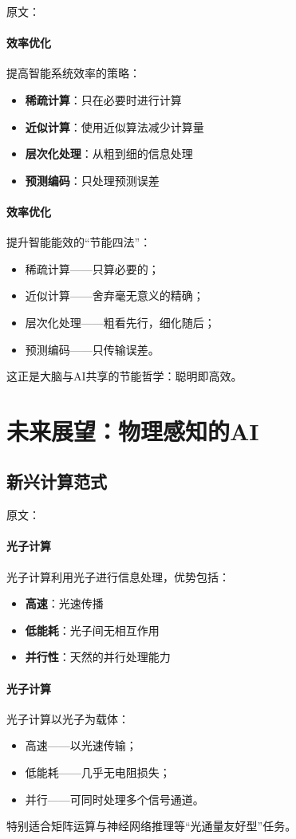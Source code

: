 原文：
\paragraph{效率优化}
提高智能系统效率的策略：
\begin{itemize}
\item \textbf{稀疏计算}：只在必要时进行计算
\item \textbf{近似计算}：使用近似算法减少计算量
\item \textbf{层次化处理}：从粗到细的信息处理
\item \textbf{预测编码}：只处理预测误差
\end{itemize}
\paragraph{效率优化}
提升智能能效的“节能四法”：
\begin{itemize}
\item 稀疏计算——只算必要的；
\item 近似计算——舍弃毫无意义的精确；
\item 层次化处理——粗看先行，细化随后；
\item 预测编码——只传输误差。
\end{itemize}
这正是大脑与AI共享的节能哲学：\;聪明即高效。

\section{未来展望：物理感知的AI}

\subsection{新兴计算范式}

原文：
\paragraph{光子计算}
光子计算利用光子进行信息处理，优势包括：
\begin{itemize}
\item \textbf{高速}：光速传播
\item \textbf{低能耗}：光子间无相互作用
\item \textbf{并行性}：天然的并行处理能力
\end{itemize}
\paragraph{光子计算}
光子计算以光子为载体：
\begin{itemize}
\item 高速——以光速传输；
\item 低能耗——几乎无电阻损失；
\item 并行——可同时处理多个信号通道。
\end{itemize}
特别适合矩阵运算与神经网络推理等“光通量友好型”任务。

